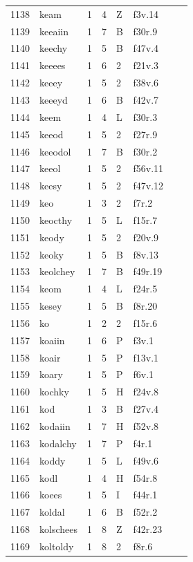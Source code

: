 \documentclass[11pt,a4paper]{article}
\begin{document}
\begin{landscape}
\begin{longtable}{@{}r>{\ttfamily}lrrl>{\ttfamily}l>{\raggedright\arraybackslash}p{80mm}>{\raggedright\arraybackslash}p{36mm}@{}}
1138 & keam & 1 & 4 & Z & f3v.14 &  & \\
1139 & keeaiin & 1 & 7 & B & f30r.9 &  & \\
1140 & keechy & 1 & 5 & B & f47v.4 &  & \\
1141 & keeees & 1 & 6 & 2 & f21v.3 &  & \\
1142 & keeey & 1 & 5 & 2 & f38v.6 &  & \\
1143 & keeeyd & 1 & 6 & B & f42v.7 &  & \\
1144 & keem & 1 & 4 & L & f30r.3 &  & \\
1145 & keeod & 1 & 5 & 2 & f27r.9 &  & \\
1146 & keeodol & 1 & 7 & B & f30r.2 &  & \\
1147 & keeol & 1 & 5 & 2 & f56v.11 &  & \\
1148 & keesy & 1 & 5 & 2 & f47v.12 &  & \\
1149 & keo & 1 & 3 & 2 & f7r.2 &  & \\
1150 & keocthy & 1 & 5 & L & f15r.7 &  & \\
1151 & keody & 1 & 5 & 2 & f20v.9 &  & \\
1152 & keoky & 1 & 5 & B & f8v.13 &  & \\
1153 & keolchey & 1 & 7 & B & f49r.19 &  & \\
1154 & keom & 1 & 4 & L & f24r.5 &  & \\
1155 & kesey & 1 & 5 & B & f8r.20 &  & \\
1156 & ko & 1 & 2 & 2 & f15r.6 &  & \\
1157 & koaiin & 1 & 6 & P & f3v.1 &  & \\
1158 & koair & 1 & 5 & P & f13v.1 &  & \\
1159 & koary & 1 & 5 & P & f6v.1 &  & \\
1160 & kochky & 1 & 5 & H & f24v.8 &  & \\
1161 & kod & 1 & 3 & B & f27v.4 &  & \\
1162 & kodaiin & 1 & 7 & H & f52v.8 &  & \\
1163 & kodalchy & 1 & 7 & P & f4r.1 &  & \\
1164 & koddy & 1 & 5 & L & f49v.6 &  & \\
1165 & kodl & 1 & 4 & H & f54r.8 &  & \\
1166 & koees & 1 & 5 & I & f44r.1 &  & \\
1167 & koldal & 1 & 6 & B & f52r.2 &  & \\
1168 & kolschees & 1 & 8 & Z & f42r.23 &  & \\
1169 & koltoldy & 1 & 8 & 2 & f8r.6 &  & \\

\end{longtable}
\end{landscape}
\end{document}
